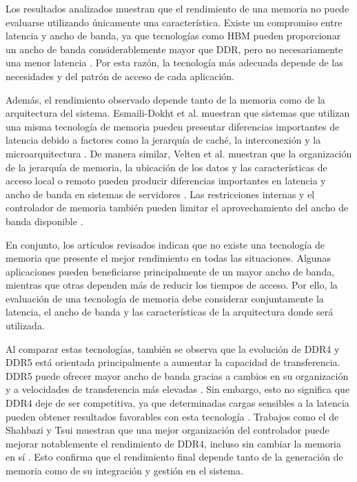 
Los resultados analizados muestran que el rendimiento de una memoria no puede
evaluarse utilizando únicamente una característica. Existe un compromiso entre
latencia y ancho de banda, ya que tecnologías como HBM pueden proporcionar un
ancho de banda considerablemente mayor que DDR, pero no necesariamente una
menor latencia \cite{ibeid2025aurora}. Por esta razón, la tecnología más
adecuada depende de las necesidades y del patrón de acceso de cada aplicación.

Además, el rendimiento observado depende tanto de la memoria como de la
arquitectura del sistema. Esmaili-Dokht et al. muestran que sistemas que
utilizan una misma tecnología de memoria pueden presentar diferencias
importantes de latencia debido a factores como la jerarquía de caché, la
interconexión y la microarquitectura \cite{esmailidokht2024mess}. De manera
similar, Velten et al. muestran que la organización de la jerarquía de memoria,
la ubicación de los datos y las características de acceso local o remoto pueden
producir diferencias importantes en latencia y ancho de banda en sistemas de
servidores \cite{velten2022memory}. Las restricciones internas y el controlador
de memoria también pueden limitar el aprovechamiento del ancho de banda
disponible \cite{eyerman2022dram}.

En conjunto, los artículos revisados indican que no existe una tecnología de
memoria que presente el mejor rendimiento en todas las situaciones. Algunas
aplicaciones pueden beneficiarse principalmente de un mayor ancho de banda,
mientras que otras dependen más de reducir los tiempos de acceso. Por ello, la
evaluación de una tecnología de memoria debe considerar conjuntamente la
latencia, el ancho de banda y las características de la arquitectura donde será
utilizada.

Al comparar estas tecnologías, también se observa que la evolución
de DDR4 y DDR5 está orientada principalmente a aumentar la capacidad de 
transferencia. DDR5 puede ofrecer mayor ancho de banda gracias a cambios 
en su organización y a velocidades de transferencia más elevadas 
\cite{steiner2022dramsys,choi2024ddr5}. Sin embargo, esto no significa
que DDR4 deje de ser competitiva, ya que determinadas cargas sensibles a 
la latencia pueden obtener resultados favorables con esta tecnología 
\cite{steiner2022dramsys}. Trabajos como el de Shahbazi y Tsui muestran que 
una mejor organización del controlador puede mejorar notablemente el 
rendimiento de DDR4, incluso sin cambiar la memoria en sí \cite{shahbazi2026ddr4}. 
Esto confirma que el rendimiento final depende tanto de la generación de memoria 
como de su integración y gestión en el sistema.